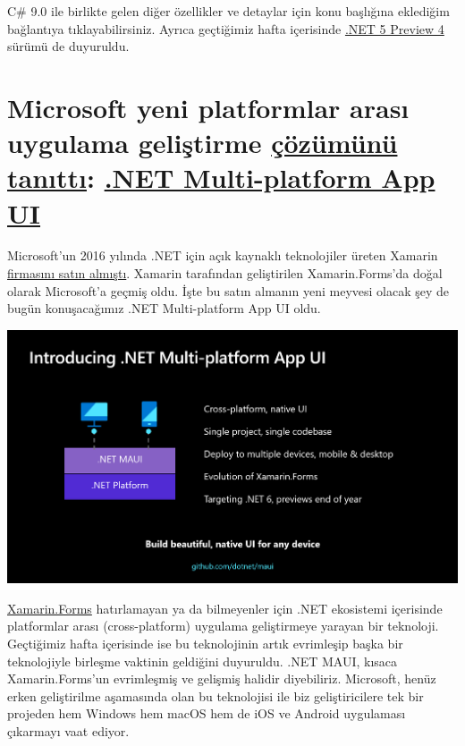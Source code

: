 \documentclass[11pt]{article}
\begin{document}
C\# 9.0 ile birlikte gelen diğer özellikler ve detaylar için konu başlığına
eklediğim bağlantıya tıklayabilirsiniz. Ayrıca geçtiğimiz hafta içerisinde
\href{https://devblogs.microsoft.com/dotnet/announcing-net-5-preview-4-and-our-journey-to-one-net/}{.NET 5 Preview 4} sürümü de duyuruldu.
\section{Microsoft yeni platformlar arası uygulama geliştirme \href{https://devblogs.microsoft.com/dotnet/introducing-net-multi-platform-app-ui/}{çözümünü tanıttı}: \href{https://github.com/dotnet/maui}{.NET Multi-platform App UI}}
\label{sec:orga47134b}
Microsoft'un 2016 yılında .NET için açık kaynaklı teknolojiler üreten Xamarin
\href{https://blogs.microsoft.com/blog/2016/02/24/microsoft-to-acquire-xamarin-and-empower-more-developers-to-build-apps-on-any-device/}{firmasını satın almıştı}. Xamarin tarafından geliştirilen Xamarin.Forms'da
doğal olarak Microsoft'a geçmiş oldu. İşte bu satın almanın yeni meyvesi
olacak şey de bugün konuşacağımız .NET Multi-platform App UI oldu.

\begin{center}
\includegraphics[width=.9\linewidth]{gorseller/dotnet-multiplatform-app-ui.png}
\end{center}

\href{https://github.com/xamarin/xamarin.forms}{Xamarin.Forms} hatırlamayan ya da bilmeyenler için .NET ekosistemi içerisinde
platformlar arası (cross-platform) uygulama geliştirmeye yarayan bir
teknoloji. Geçtiğimiz hafta içerisinde ise bu teknolojinin artık evrimleşip
başka bir teknolojiyle birleşme vaktinin geldiğini duyuruldu. .NET MAUI,
kısaca Xamarin.Forms'un evrimleşmiş ve gelişmiş halidir diyebiliriz.
Microsoft, henüz erken geliştirilme aşamasında olan bu teknolojisi ile biz
geliştiricilere tek bir projeden hem Windows hem macOS hem de iOS ve Android
uygulaması çıkarmayı vaat ediyor.
\end{document}
